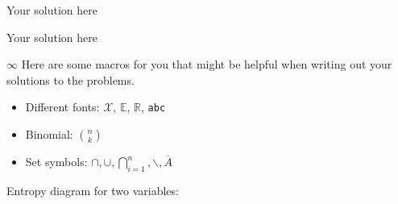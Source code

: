 \documentclass[a4paper,10pt]{scrartcl}
\begin{document}

\begin{question}{1}
Your solution here
\end{question}

\begin{question}{5}
Your solution here
\end{question}

\begin{question}{$\infty$}
Here are some macros for you that might be helpful when writing out your solutions to the problems.

\begin{itemize}
\item Different fonts: $\mathcal{X}$, $\mathbb{E}$, $\mathbb{R}$, \texttt{abc}
\item Binomial: $\binom{n}{k}$
\item Set symbols: $\cap, \cup, \bigcap_{i=1}^n, \backslash, \overline{A}$
\end{itemize}


Entropy diagram for two variables:
\begin{center}
\end{center}
\end{question}
\end{document}
